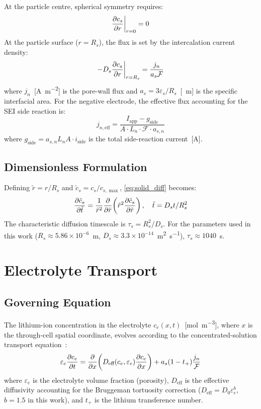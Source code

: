 At the particle centre, spherical symmetry requires:
\begin{equation}
  \dfrac{\partial c_s}{\partial r}\bigg|_{r=0} = 0
  \label{eq:bc_centre}
\end{equation}
At the particle surface ($r = R_s$), the flux is set by the intercalation current density:
\begin{equation}
  -D_s \dfrac{\partial c_s}{\partial r}\bigg|_{r=R_s} = \frac{j_n}{a_s \mathcal{F}}
  \label{eq:bc_surface}
\end{equation}
where $j_n$~[\si{\ampere\per\meter\squared}] is the pore-wall flux and $a_s = 3\varepsilon_s/R_s$~[\si{\per\meter}] is the specific interfacial area. For the negative electrode, the effective flux accounting for the SEI side reaction is:
\begin{equation}
  j_{n,\text{eff}} = \frac{I_\text{app} - g_\text{side}}{A \cdot L_n \cdot \mathcal{F} \cdot a_{s,n}}
  \label{eq:flux_n_sei}
\end{equation}
where $g_\text{side} = a_{s,n} L_n A \cdot i_\text{side}$ is the total side-reaction current~[\si{\ampere}].

\subsection{Dimensionless Formulation}

Defining $\tilde{r} = r/R_s$ and $\tilde{c}_s = c_s/c_{s,\max}$, \cref{eq:solid_diff} becomes:
\begin{equation}
  \dfrac{\partial \tilde{c}_s}{\partial \tilde{t}} = \frac{1}{\tilde{r}^2}\dfrac{\partial }{\partial \tilde{r}}\!\left(\tilde{r}^2\dfrac{\partial \tilde{c}_s}{\partial \tilde{r}}\right), \quad \tilde{t} = D_s t / R_s^2
  \label{eq:solid_diff_nondim}
\end{equation}
The characteristic diffusion timescale is $\tau_s = R_s^2/D_s$. For the parameters used in this work ($R_s \approx 5.86 \times 10^{-6}$~m, $D_s \approx 3.3\times10^{-14}$~\si{\meter\squared\per\second}), $\tau_s \approx 1040$~s.

\section{Electrolyte Transport}
\label{sec:electrolyte_transport}

\subsection{Governing Equation}

The lithium-ion concentration in the electrolyte $c_e(x,t)$~[\si{\mol\per\meter\cubed}], where $x$ is the through-cell spatial coordinate, evolves according to the concentrated-solution transport equation~\cite{Newman2004}:
\begin{equation}
  \varepsilon_e \dfrac{\partial c_e}{\partial t} = \dfrac{\partial }{\partial x}\!\left(D_\text{eff}(c_e,\varepsilon_e)\dfrac{\partial c_e}{\partial x}\right) + a_s(1-t_+)\frac{j_n}{\mathcal{F}}
  \label{eq:electrolyte_pde}
\end{equation}
where $\varepsilon_e$ is the electrolyte volume fraction (porosity), $D_\text{eff}$ is the effective diffusivity accounting for the Bruggeman tortuosity correction ($D_\text{eff} = D_0 \varepsilon_e^b$, $b=1.5$ in this work), and $t_+$ is the lithium transference number.

